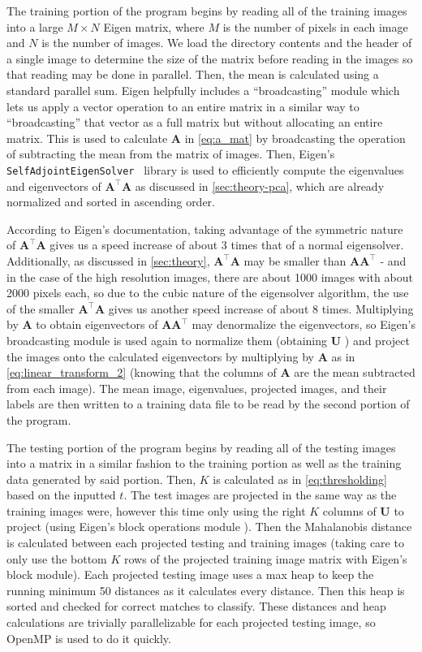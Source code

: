 \documentclass[headings=optiontoheadandtoc,listof=totoc,parskip=full]{scrartcl}
\begin{document}
The training portion of the program begins by reading all of the training images into a large $M \times N$ Eigen matrix, where $M$ is the number of pixels in each image and $N$ is the number of images. We load the directory contents and the header of a single image to determine the size of the matrix before reading in the images so that reading may be done in parallel. Then, the mean is calculated using a standard parallel sum. Eigen helpfully includes a ``broadcasting'' module \autocite{eigenBroadcast} which lets us apply a vector operation to an entire matrix in a similar way to ``broadcasting'' that vector as a full matrix but without allocating an entire matrix. This is used to calculate $\mathbf A$ in \cref{eq:a_mat} by broadcasting the operation of subtracting the mean from the matrix of images. Then, Eigen's \texttt{SelfAdjointEigenSolver}~\autocite{eigenSolver} library is used to efficiently compute the eigenvalues and eigenvectors of $\mathbf{A^\top A}$ as discussed in \cref{sec:theory-pca}, which are already normalized and sorted in ascending order. 

According to Eigen's documentation, taking advantage of the symmetric nature of $\mathbf{A^\top A}$ gives us a speed increase of about 3 times that of a normal eigensolver. Additionally, as discussed in \cref{sec:theory}, $\mathbf{A^\top A}$ may be smaller than $\mathbf{AA}^\top$ - and in the case of the high resolution images, there are about 1000 images with about 2000 pixels each, so due to the cubic nature of the eigensolver algorithm, the use of the smaller $\mathbf{A^\top A}$ gives us another speed increase of about 8 times. Multiplying by $\mathbf A$ to obtain eigenvectors of $\mathbf{AA}^\top$ may denormalize the eigenvectors, so Eigen's broadcasting module is used again to normalize them (obtaining $\mathbf U$ ) and project the images onto the calculated eigenvectors by multiplying by $\mathbf A$ as in \cref{eq:linear_transform_2} (knowing that the columns of $\mathbf A$ are the mean subtracted from each image). The mean image, eigenvalues, projected images, and their labels are then written to a training data file to be read by the second portion of the program.

The testing portion of the program begins by reading all of the testing images into a matrix in a similar fashion to the training portion as well as the training data generated by said portion. Then, $K$ is calculated as in \cref{eq:thresholding} based on the inputted $t$. The test images are projected in the same way as the training images were, however this time only using the right $K$ columns of $\mathbf U$ to project (using Eigen's block operations module \autocite{eigenBlock}). Then the Mahalanobis distance is calculated between each projected testing and training images (taking care to only use the bottom $K$ rows of the projected training image matrix with Eigen's block module). Each projected testing image uses a max heap to keep the running minimum 50 distances as it calculates every distance. Then this heap is sorted and checked for correct matches to classify. These distances and heap calculations are trivially parallelizable for each projected testing image, so OpenMP is used to do it quickly.
\end{document}
